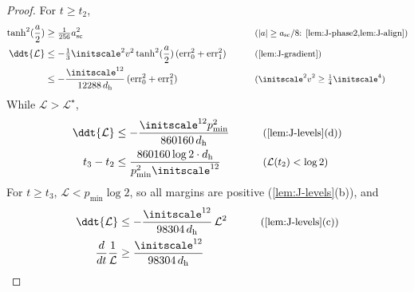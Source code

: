 \begin{proof}
For $t\ge t_2$,
\begin{alignat*}{2}
 \tanh^2(\frac{a}{2})&\ge\tfrac{1}{256}a_{\mathrm{sc}}^2 &\qquad& \why{$|a|\ge a_{\mathrm{sc}}/8$: \cref{lem:J-phase2,lem:J-align}}\\
 \ddt{\mathcal L}&\le-\tfrac{1}{3}\initscale^2v^2\tanh^2(\frac{a}{2})\,(\mathrm{err}_0^2+\mathrm{err}_1^2) && \why{\cref{lem:J-gradient}}\\
 &\le-\frac{\initscale^{12}}{12288\,d_{\mathrm h}}\,(\mathrm{err}_0^2+\mathrm{err}_1^2) && \why{$\initscale^2v^2\ge\tfrac{1}{4}\initscale^4$}
\end{alignat*}
While $\mathcal L>\mathcal L^\star$,
\begin{alignat*}{2}
 \ddt{\mathcal L}&\le-\frac{\initscale^{12}p_{\min}^2}{860160\,d_{\mathrm h}} &\qquad& \why{\cref{lem:J-levels}(d)}\\
 t_3-t_2&\le\frac{860160\log2\cdot d_{\mathrm h}}{p_{\min}^2\initscale^{12}} && \why{$\mathcal L(t_2)<\log2$}
\end{alignat*}
For $t\ge t_3$, $\mathcal L<p_{\min}\log2$, so all margins are positive (\cref{lem:J-levels}(b)), and
\begin{alignat*}{2}
 \ddt{\mathcal L}&\le-\frac{\initscale^{12}}{98304\,d_{\mathrm h}}\,\mathcal L^2 &\qquad& \why{\cref{lem:J-levels}(c)}\\
 \frac{d}{dt}\frac{1}{\mathcal L}&\ge\frac{\initscale^{12}}{98304\,d_{\mathrm h}} && \qedhere
\end{alignat*}
\end{proof}

